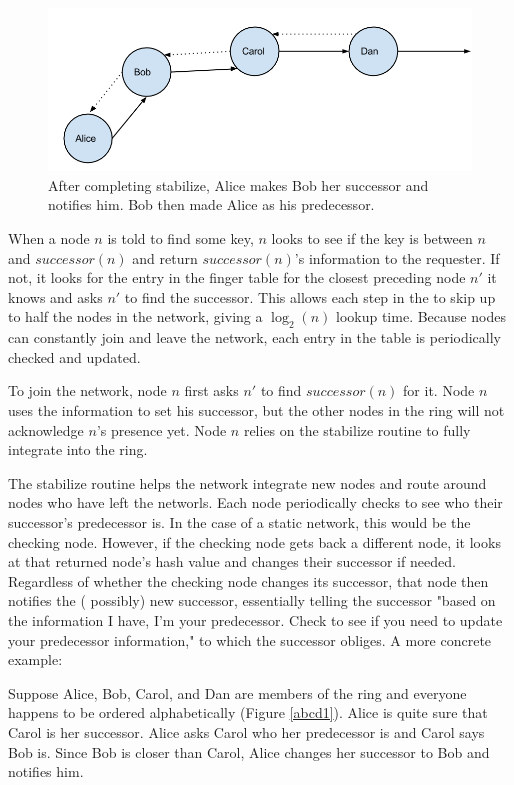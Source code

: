 \documentclass[conference, compsocconf, letterpaper]{IEEEtran}
\begin{document}
\begin{figure}
    \includegraphics[width=\linewidth]{abcd2}
    \caption{After completing stabilize, Alice makes Bob her successor and notifies him. Bob then made Alice as his predecessor.}
    \label{abcd2}
\end{figure}



When a node $n$ is told to find some key, $n$ looks to see if the key is between $n$ and $successor(n)$ and return $successor(n)$'s information to the requester. If not, it looks for the entry in the finger table for the closest preceding node $n'$ it knows and asks $n'$ to find the successor.  This allows each step in the to skip up to half the nodes in the network, giving a $\log_2(n)$ lookup time.  Because nodes can constantly join and leave the network, each entry in the table is periodically checked and updated. 

To join the network, node $n$ first asks $n'$ to find $successor(n)$ for it.  Node $n$ uses the information to set his successor, but the other nodes in the ring will not acknowledge $n$'s presence yet.  Node $n$ relies on the stabilize routine to fully integrate into the ring.

The stabilize routine helps the network integrate new nodes and route around nodes who have left the networls. Each node periodically checks to see who their successor's predecessor is.  In the case of a static network, this would be the checking node.  However, if the checking node gets back a different node, it looks at that returned node's hash value and changes their successor if needed.  Regardless of whether the checking node changes its successor, that node then notifies the ( possibly) new successor,  essentially telling the successor "based on the information I have, I'm your predecessor.  Check to see if you need to update your predecessor information," to which the successor obliges.  A more concrete example:


Suppose Alice, Bob, Carol, and Dan are members of the ring and everyone happens to be ordered alphabetically (Figure \ref{abcd1}). Alice is quite sure that Carol is her successor.  Alice asks Carol who her predecessor is and Carol says Bob is.  Since Bob is closer than Carol, Alice changes her successor to Bob and notifies him.  
\end{document}

